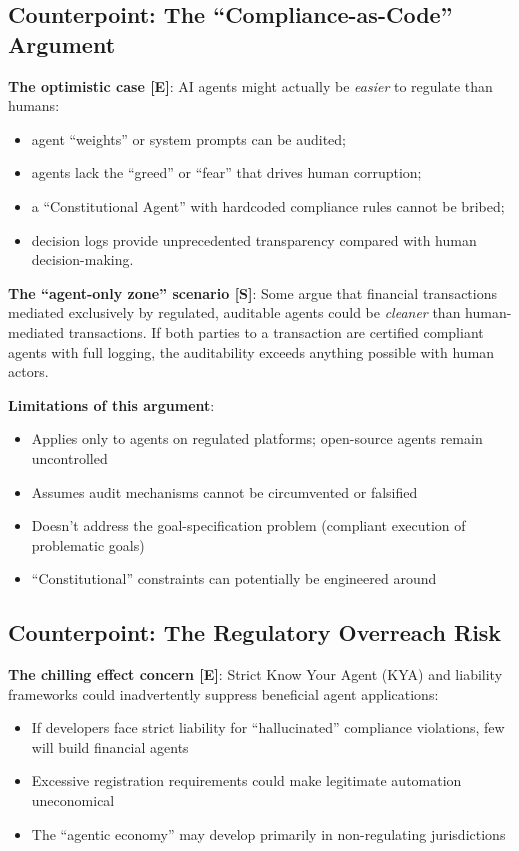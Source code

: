 \documentclass[11pt,letterpaper]{article}
\begin{document}
\subsection{Counterpoint: The ``Compliance-as-Code'' Argument}

\textbf{The optimistic case [E]}: AI agents might actually be \textit{easier} to regulate than humans:
\begin{itemize}
  \item agent ``weights'' or system prompts can be audited;
  \item agents lack the ``greed'' or ``fear'' that drives human corruption;
  \item a ``Constitutional Agent'' with hardcoded compliance rules cannot be bribed;
  \item decision logs provide unprecedented transparency compared with human decision-making.
\end{itemize}

\textbf{The ``agent-only zone'' scenario [S]}: Some argue that financial transactions mediated exclusively by regulated, auditable agents could be \textit{cleaner} than human-mediated transactions. If both parties to a transaction are certified compliant agents with full logging, the auditability exceeds anything possible with human actors.

\textbf{Limitations of this argument}:
\begin{itemize}
  \item Applies only to agents on regulated platforms; open-source agents remain uncontrolled
  \item Assumes audit mechanisms cannot be circumvented or falsified
  \item Doesn't address the goal-specification problem (compliant execution of problematic goals)
  \item ``Constitutional'' constraints can potentially be engineered around
\end{itemize}

\subsection{Counterpoint: The Regulatory Overreach Risk}

\textbf{The chilling effect concern [E]}: Strict Know Your Agent (KYA) and liability frameworks could inadvertently suppress beneficial agent applications:
\begin{itemize}
  \item If developers face strict liability for ``hallucinated'' compliance violations, few will build financial agents
  \item Excessive registration requirements could make legitimate automation uneconomical
  \item The ``agentic economy'' may develop primarily in non-regulating jurisdictions
\end{itemize}
\end{document}
